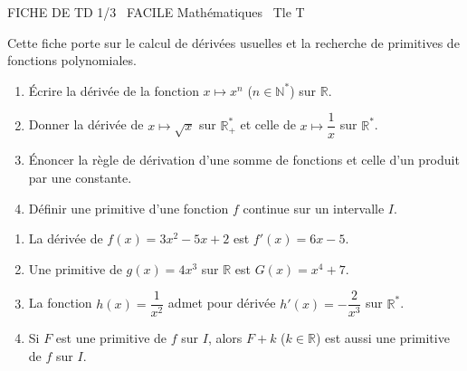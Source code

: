 \documentclass[11pt]{article}
\begin{document}
\begin{tcolorbox}[enhanced,colback=popink,colframe=popink,arc=10pt,boxrule=0pt,left=12pt,right=12pt,top=9pt,bottom=9pt]
{\color{white}\popxbold\small FICHE DE TD 1/3 \textbullet\ FACILE \hfill Mathématiques \textbullet\ Tle T\par}
\end{tcolorbox}
\vspace{4pt}
Cette fiche porte sur le calcul de dérivées usuelles et la recherche de primitives de fonctions polynomiales.

\begin{exercice}
\begin{enumerate}
    \item Écrire la dérivée de la fonction $x \mapsto x^n$ ($n \in \mathbb{N}^*$) sur $\mathbb{R}$.
    \item Donner la dérivée de $x \mapsto \sqrt{x}$ sur $\mathbb{R}_+^*$ et celle de $x \mapsto \dfrac{1}{x}$ sur $\mathbb{R}^*$.
    \item Énoncer la règle de dérivation d'une somme de fonctions et celle d'un produit par une constante.
    \item Définir une primitive d'une fonction $f$ continue sur un intervalle $I$.
\end{enumerate}
\end{exercice}

\begin{exercice}
\begin{enumerate}
    \item La dérivée de $f(x) = 3x^2 - 5x + 2$ est $f'(x) = 6x - 5$.
    \item Une primitive de $g(x) = 4x^3$ sur $\mathbb{R}$ est $G(x) = x^4 + 7$.
    \item La fonction $h(x) = \dfrac{1}{x^2}$ admet pour dérivée $h'(x) = -\dfrac{2}{x^3}$ sur $\mathbb{R}^*$.
    \item Si $F$ est une primitive de $f$ sur $I$, alors $F + k$ ($k \in \mathbb{R}$) est aussi une primitive de $f$ sur $I$.
\end{enumerate}
\end{exercice}
\end{document}
